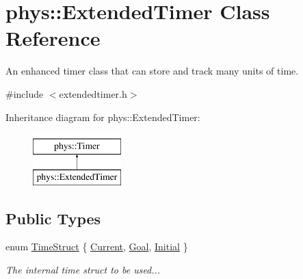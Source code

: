 \hypertarget{classphys_1_1ExtendedTimer}{
\section{phys::ExtendedTimer Class Reference}
\label{dc/d7c/classphys_1_1ExtendedTimer}
}


An enhanced timer class that can store and track many units of time.  




{\ttfamily \#include $<$extendedtimer.h$>$}

Inheritance diagram for phys::ExtendedTimer:\begin{figure}[H]
\begin{center}
\leavevmode
\includegraphics[height=2.000000cm]{dc/d7c/classphys_1_1ExtendedTimer}
\end{center}
\end{figure}
\subsection*{Public Types}
\begin{DoxyCompactItemize}
\item 
enum \hyperlink{classphys_1_1ExtendedTimer_a0f316e9347d1c118a157cc3c737c554b}{TimeStruct} \{ \hyperlink{classphys_1_1ExtendedTimer_a0f316e9347d1c118a157cc3c737c554bab42e601e90bdd3d9a40e8bd2203748f4}{Current}, 
\hyperlink{classphys_1_1ExtendedTimer_a0f316e9347d1c118a157cc3c737c554ba7179bcde29cd5fdda024ebe5f42207ae}{Goal}, 
\hyperlink{classphys_1_1ExtendedTimer_a0f316e9347d1c118a157cc3c737c554baca4dbfbcf56212e4df189c571d9718b3}{Initial}
 \}
\begin{DoxyCompactList}\small\item\em The internal time struct to be used... \item\end{DoxyCompactList}\end{DoxyCompactItemize}
